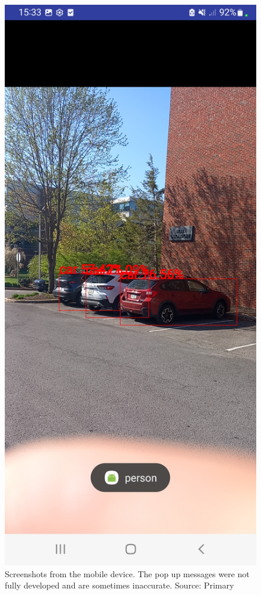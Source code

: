\begin{figure}[H]
    \includegraphics[scale=0.11]{figure/ObjectDetection_3cars.jpg}
    \caption{Screenshots from the mobile device. The pop up messages were not fully developed and are sometimes inaccurate. Source: Primary}
    \label{fig:Objectdetection-screenshot}
\end{figure}
